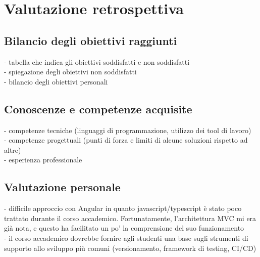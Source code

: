 \cleardoublepage
\chapter{Valutazione retrospettiva}
\label{cap:valutazione-retrospettiva}
\section{Bilancio degli obiettivi raggiunti}
- tabella che indica gli obiettivi soddisfatti e non soddisfatti \\
- spiegazione degli obiettivi non soddisfatti\\
- bilancio degli obiettivi personali
\section{Conoscenze e competenze acquisite}
- competenze tecniche (linguaggi di programmazione, utilizzo dei tool di lavoro)\\
- competenze progettuali (punti di forza e limiti di alcune soluzioni rispetto ad altre)\\
- esperienza professionale\\

\section{Valutazione personale}
- difficile approccio con Angular in quanto javascript/typescript è stato poco trattato durante il corso accademico. Fortunatamente, l'architettura MVC mi era già nota, e questo ha facilitato un po' la comprensione del suo funzionamento\\
- il corso accademico dovrebbe fornire agli studenti una base sugli strumenti di supporto allo sviluppo più comuni (versionamento, framework di testing, CI/CD)